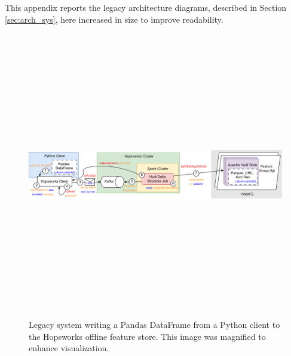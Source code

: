 This appendix reports the legacy architecture diagrams, described in Section \ref{sec:arch_sys}, here increased in size to improve readability.

\begin{figure}
    \begin{center}
      \includegraphics[angle=90,origin=c,keepaspectratio,height=12.5cm]{figures/2-background_and_related_work/hudi_write.png}
    \end{center}
    \caption[Legacy system - Write process - Magnified diagram]{Legacy system writing a Pandas DataFrame from a Python client to the Hopsworks offline feature store.  This image was magnified to enhance visualization.}
    \label{fig:appx_hudi_write_schema}
\end{figure}

